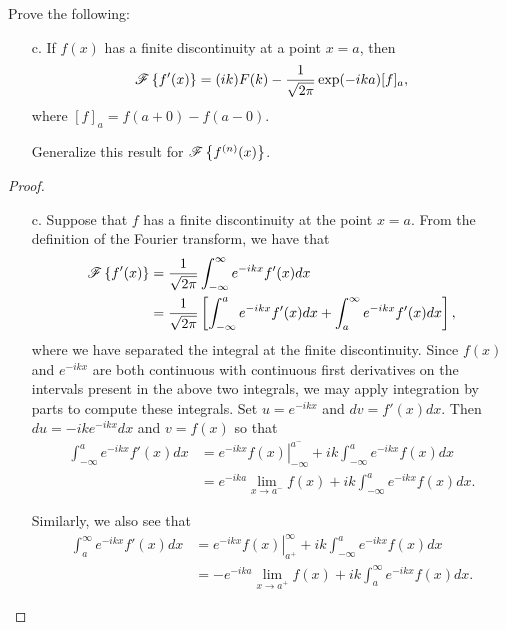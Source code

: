 \begin{problem}{2.5}
  Prove the following:
  \begin{enumerate}
    \item [c.] If $f(x)$ has a finite discontinuity at a point $x = a$, then
      \begin{align*}
        \mathscr{F}\left\{ {f'(x)} \right\} = (ik) F(k) - \frac{1}{\sqrt{2\pi}}\exp(-ika)[f]_a,
      \end{align*}
      where $[f]_a = f(a + 0) - f (a - 0).$

      Generalize this result for $\mathscr{F}\left\{ {f^{(n)}(x)} \right\}$.
  \end{enumerate}
\end{problem}

\begin{proof}
  \begin{enumerate}
    \item [c.] Suppose that $f$ has a finite discontinuity at the point $x=a$. From
      the definition of the Fourier transform, we have that
      \begin{align}\label{int}
        \mathscr{F}\left\{ {f'(x)} \right\} &= \frac{1}{\sqrt{2\pi}} \int_{-\infty}^{\infty} e^{-ikx} f'(x) dx \notag \\
        &= \frac{1}{\sqrt{2\pi}} \left[\int_{-\infty}^{a} e^{-ikx} f'(x) dx + \int_{a}^{\infty} e^{-ikx} f'(x) dx \right],
      \end{align}
      where we have separated the integral at the finite discontinuity. Since $f(x)$ and $e^{-ikx}$ are both
      continuous with continuous first derivatives on the intervals present in the above two integrals,
      we may apply integration by parts to compute these integrals. Set $u=e^{-ikx}$ and $dv=f'(x)dx$. Then
      $du = -ik e^{-ikx}dx$ and $v = f(x)$ so that
      \begin{align*}
        \int_{-\infty}^{a} e^{-ikx} f'(x) dx &= \left. e^{-ikx}f(x) \right\rvert_{-\infty}^{a^-} + ik \int_{-\infty}^a e^{-ikx}f(x) dx \\
        &= e^{-ika} \lim_{x\to a^{-}}f(x)  + ik \int_{-\infty}^a e^{-ikx}f(x) dx.
      \end{align*}

      Similarly, we also see that
      \begin{align*}
        \int_{a}^{\infty} e^{-ikx} f'(x) dx
        &= \left. e^{-ikx}f(x) \right\rvert_{a^+}^{\infty} + ik \int_{-\infty}^a e^{-ikx}f(x) dx \\
        &= -e^{-ika} \lim_{x\to a^{+}}f(x)  + ik \int_{a}^\infty e^{-ikx}f(x) dx.
      \end{align*}


\end{enumerate}
\end{proof}
